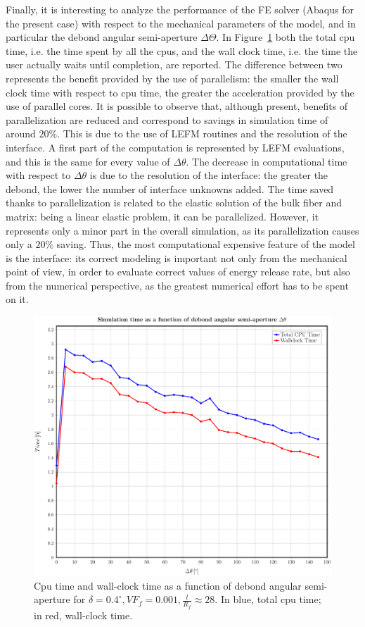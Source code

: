 \documentclass[a4paper]{jpconf}
\begin{document}
Finally, it is interesting to analyze the performance of the FE solver (Abaqus for the present case) with respect to the mechanical parameters of the model, and in particular the debond angular semi-aperture $\Delta\Theta$. In Figure~\ref{fig:cputimes} both the total cpu time, i.e. the time spent by all the cpus, and the wall clock time, i.e. the time the user actually waits until completion, are reported. The difference between two represents the benefit provided by the use of parallelism: the smaller the wall clock time with respect to cpu time, the greater the acceleration provided by the use of parallel cores. It is possible to observe that, although present, benefits of parallelization are reduced and correspond to savings in simulation time of around $20\%$. This is due to the use of LEFM routines and the resolution of the interface. A first part of the computation is represented by LEFM evaluations, and this is the same for every value of $\Delta\theta$. The decrease in computational time with respect to $\Delta\theta$ is due to the resolution of the interface: the greater the debond, the lower the number of interface unknowns added. The time saved thanks to parallelization is related to the elastic solution of the bulk fiber and matrix: being a linear elastic problem, it can be parallelized. However, it represents only a minor part in the overall simulation, as its parallelization causes only a $20\%$ saving. Thus, the most computational expensive feature of the model is the interface: its correct modeling is important not only from the mechanical point of view, in order to evaluate correct values of energy release rate, but also from the numerical perspective, as the greatest numerical effort has to be spent on it.

\begin{figure}[H]
\centering
     \includegraphics[height=0.45\textheight]{cpus-time.pdf}
 \caption{Cpu time and wall-clock time as a function of debond angular semi-aperture for $\delta=0.4^{\circ},VF_{f}=0.001,\frac{l}{R_{f}}\approx28$. In blue, total cpu time; in red, wall-clock time.}
\label{fig:cputimes}
\end{figure}
\end{document}
